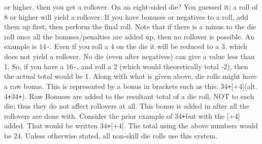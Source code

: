 \documentclass[twoside]{book}
\begin{document}
               or higher, then you get a rollover. On an eight-sided die?
               You guessed it; a roll of 8 or higher will yield a
               rollover.  If you have bonuses or negatives to a roll, add them
               up first, then perform the final roll.  Note that if there is a minus to the die roll once
               all the bonuses/penalties are added up, then no rollover
               is possible. An example is \ensuremath{1}\ensuremath{4}\texttt{-}. Even if you roll a 4 on
               the die it will be reduced to a 3, which does not yield a
               rollover. No die (even after negatives) can give a value
               less than 1. So, if you have a \ensuremath{1}\ensuremath{6}\texttt{-}, and roll a 2 (which
               would theoretically total -2), then the actual total would
               be 1.  Along with what is given above, die rolls might have
               a raw bonus. This is represented by a bonus in brackets
               such as this: \ensuremath{3}\ensuremath{4}\texttt{+}\textscbf{}[\ensuremath{\texttt{+}\ensuremath{4}}](alt. \ensuremath{4}\texttt{+}\ensuremath{3}\ensuremath{4}\texttt{+}). Raw Bonuses are
               added to the resultant total of a die roll, NOT to each
               die; thus they do not affect rollovers at all. This bonus
               is added in after all the rollovers are done with.
               Consider the prior example of \ensuremath{3}\ensuremath{4}\texttt{+}but with the [+4]
               added. That would be written \ensuremath{3}\ensuremath{4}\texttt{+}\textscbf{}[\ensuremath{\texttt{+}\ensuremath{4}}]. The total using
               the above numbers would be 24.  Unless otherwise stated, all non-skill die rolls use
               this system. 
    
\end{document}
